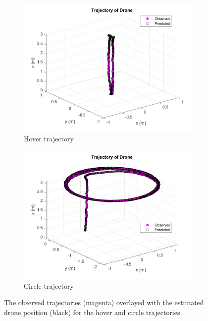 \documentclass[letterpaper, paper,11pt]{AAS}	%
\begin{document}
\begin{figure}[H]
\centering
\begin{subfigure}{.5\textwidth}
	\centering
	\includegraphics[width=\textwidth]{Figures/hover1_traj}
	\caption{Hover trajectory}
	\label{fig:hover1_traj}
\end{subfigure}%
\begin{subfigure}{.5\textwidth}
	\centering
	\includegraphics[width=\textwidth]{Figures/circle1_traj}
	\caption{Circle trajectory}
	\label{fig:circle1_traj}
\end{subfigure}
\caption{The observed trajectories (magenta) overlayed with the estimated drone position (black) for the hover and circle trajectories}
\label{fig:Overlay1}
\end{figure}
\end{document}
